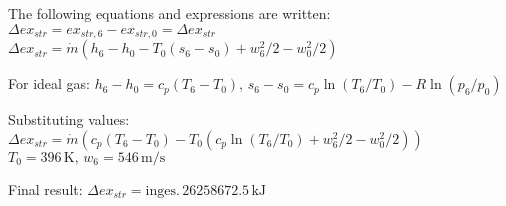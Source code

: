 The following equations and expressions are written:  
\( \Delta ex_{str} = ex_{str,6} - ex_{str,0} = \Delta ex_{str} \)  
\( \Delta ex_{str} = \dot{m} (h_6 - h_0 - T_0 (s_6 - s_0) + w_6^2 / 2 - w_0^2 / 2) \)  

For ideal gas:  
\( h_6 - h_0 = c_p (T_6 - T_0), \, s_6 - s_0 = c_p \ln(T_6 / T_0) - R \ln(p_6 / p_0) \)  

Substituting values:  
\( \Delta ex_{str} = \dot{m} (c_p (T_6 - T_0) - T_0 (c_p \ln(T_6 / T_0) + w_6^2 / 2 - w_0^2 / 2)) \)  
\( T_0 = 396 \, \text{K}, \, w_6 = 546 \, \text{m/s} \)  

Final result:  
\( \Delta ex_{str} = \text{inges.} \, 26258672.5 \, \text{kJ} \)